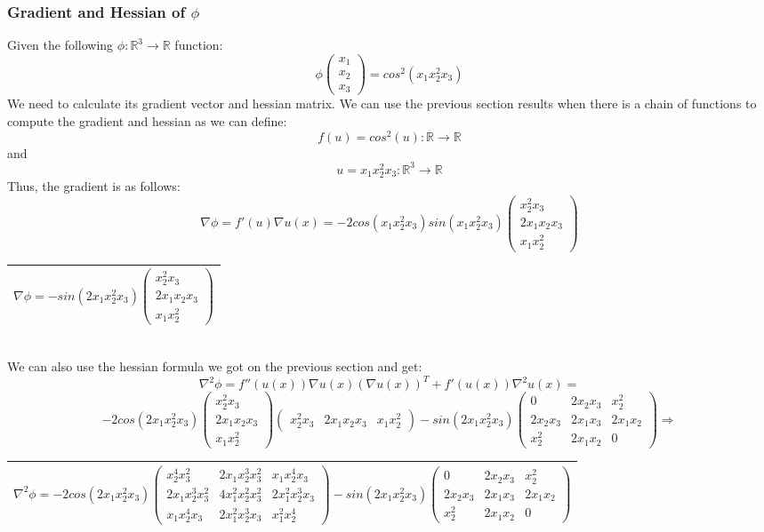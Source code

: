 \documentclass[12pt]{article}
\newcommand{\rectres}[1]{
\begin{center}
\begin{tabular}{ |c| }
\hline
 #1\\
\hline
\end{tabular}
\end{center}
}
\begin{document}
\subsubsection{Gradient and Hessian of $\phi$}
Given the following $\phi:\mathbb{R}^3\rightarrow\mathbb{R}$ function:
$$\phi \begin{pmatrix}x_1\\x_2\\x_3 \end{pmatrix} = cos^2(x_1x^2_2x_3)$$
We need to calculate its gradient vector and hessian matrix.
We can use the previous section results when there is a chain of functions to compute the gradient and hessian as we can define:
$$f(u)=cos^2(u):\mathbb{R}\rightarrow\mathbb{R}$$ and $$u=x_1x^2_2x_3:\mathbb{R}^3\rightarrow\mathbb{R}$$
Thus, the gradient is as follows:
$$\nabla \phi = f'(u)\nabla u(x) = -2cos(x_1x^2_2x_3)sin(x_1x^2_2x_3)\begin{pmatrix}x^2_2x_3\\2x_1x_2x_3\\x_1x^2_2 \end{pmatrix}$$
\rectres{$\nabla \phi = -sin(2x_1x^2_2x_3)\begin{pmatrix}x^2_2x_3\\2x_1x_2x_3\\x_1x^2_2 \end{pmatrix}$}\\
We can also use the hessian formula we got on the previous section and get:
$$\nabla^2 \phi = f''(u(x))\nabla u(x)(\nabla u(x))^T + f'(u(x))\nabla^2 u(x)=$$
$$-2cos(2x_1x^2_2x_3)\begin{pmatrix}x^2_2x_3\\2x_1x_2x_3\\x_1x^2_2 \end{pmatrix}\begin{pmatrix}x^2_2x_3 & 2x_1x_2x_3 & x_1x^2_2 \end{pmatrix} - sin(2x_1x^2_2x_3)\begin{pmatrix}0 & 2x_2x_3 & x^2_2\\2x_2x_3 & 2x_1x_3 & 2x_1x_2\\x^2_2 & 2x_1x_2 & 0 \end{pmatrix} \Rightarrow$$
\rectres{$\nabla^2 \phi = -2cos(2x_1x^2_2x_3)\begin{pmatrix}x^4_2x^2_3 & 2x_1x^3_2x^2_3 & x_1x^4_2x_3\\2x_1x^3_2x^2_3 & 4x^2_1x^2_2x^2_3 & 2x^2_1x^3_2x_3\\x_1x^4_2x_3 & 2x^2_1x^3_2x_3 & x^2_1x^4_2 \end{pmatrix} - sin(2x_1x^2_2x_3)\begin{pmatrix}0 & 2x_2x_3 & x^2_2\\2x_2x_3 & 2x_1x_3 & 2x_1x_2\\x^2_2 & 2x_1x_2 & 0 \end{pmatrix}$}
\end{document}
